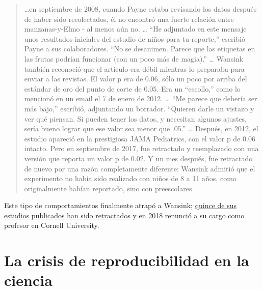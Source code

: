\documentclass[
  12pt,
]{book}
\theoremstyle{definition}
\theoremstyle{definition}
\theoremstyle{definition}
\theoremstyle{remark}
\begin{document}
\begin{quote}
\ldots en septiembre de 2008, cuando Payne estaba revisando los datos después de haber sido recolectados, él no encontró una fuerte relación entre manzanas-y-Elmo - al menos aún no. \ldots{}
``He adjuntado en este mensaje unos resultados iniciales del estudio de niños para tu reporte,'' escribió Payne a sus colaboradores. ``No se desanimen. Parece que las etiquetas en las frutas podrían funcionar (con un poco más de magia).'' \ldots{}
Wansink también reconoció que el artículo era débil mientras lo preparaba para enviar a las revistas. El valor p era de 0.06, sólo un poco por arriba del estándar de oro del punto de corte de 0.05. Era un ``escollo,'' como lo mencionó en un email el 7 de enero de 2012. \ldots{}
``Me parece que debería ser más bajo,'' escribió, adjuntando un borrador. ``Quieren darle un vistazo y ver qué piensan. Si pueden tener los datos, y necesitan algunos ajustes, sería bueno lograr que ese valor sea menor que .05.'' \ldots{}
Después, en 2012, el estudio apareció en la prestigiosa JAMA Pediatrics, con el valor p de 0.06 intacto. Pero en septiembre de 2017, fue retractado y reemplazado con una versión que reporta un valor p de 0.02. Y un mes después, fue retractado de nuevo por una razón completamente diferente: Wansink admitió que el experimento no había sido realizado con niños de 8 a 11 años, como originalmente habían reportado, sino con preescolares.
\end{quote}

Este tipo de comportamientos finalmente atrapó a Wansink; \href{https://www.vox.com/science-and-health/2018/9/19/17879102/brian-wansink-cornell-food-brand-lab-retractions-jama}{quince de sus estudios publicados han sido retractados} y en 2018 renunció a su cargo como profesor en Cornell University.

\hypertarget{la-crisis-de-reproducibilidad-en-la-ciencia}{%
\section{La crisis de reproducibilidad en la ciencia}\label{la-crisis-de-reproducibilidad-en-la-ciencia}}
\end{document}
